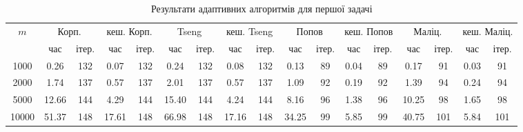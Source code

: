 \begin{table}[H]
    \centering
    \begin{tabular}{||c||c|c|c|c||c|c|c|c||c|c|c|c||c|c|c|c||} \hline \hline
        \multirow{2}{*}{$m$} & \multicolumn{2}{c|}{Корп.} & \multicolumn{2}{c||}{кеш. Корп.} & \multicolumn{2}{c|}{Tseng} & \multicolumn{2}{c||}{кеш. Tseng} & \multicolumn{2}{c|}{Попов} & \multicolumn{2}{c||}{кеш. Попов} & \multicolumn{2}{c|}{Маліц.} & \multicolumn{2}{c||}{кеш. Маліц.} \\ \cline{2-17}
         & час & ітер. & час & ітер. & час & ітер. & час & ітер. & час & ітер. & час & ітер. & час & ітер. & час & ітер. \\ \hline \hline
        1000 & 0.26 & 132 & 0.07 & 132 & 0.24 & 132 & 0.08 & 132 & 0.13 & 89 & 0.04 & 89 & 0.17 & 91 & 0.03 & 91 \\ \hline
        2000 & 1.74 & 137 & 0.57 & 137 & 2.01 & 137 & 0.57 & 137 & 1.09 & 92 & 0.19 & 92 & 1.39 & 94 & 0.24 & 94 \\ \hline
        5000 & 12.66 & 144 & 4.29 & 144 & 15.40 & 144 & 4.24 & 144 & 8.16 & 96 & 1.38 & 96 & 10.25 & 98 & 1.65 & 98 \\ \hline
        10000 & 51.37 & 148 & 17.61 & 148 & 66.98 & 148 & 17.16 & 148 & 34.25 & 99 & 5.85 & 99 & 40.75 & 101 & 5.84 & 101 \\ \hline
        \hline
    \end{tabular}
    \caption{Результати адаптивних алгоритмів для першої задачі}
    \label{tab:1-adapt}
\end{table}